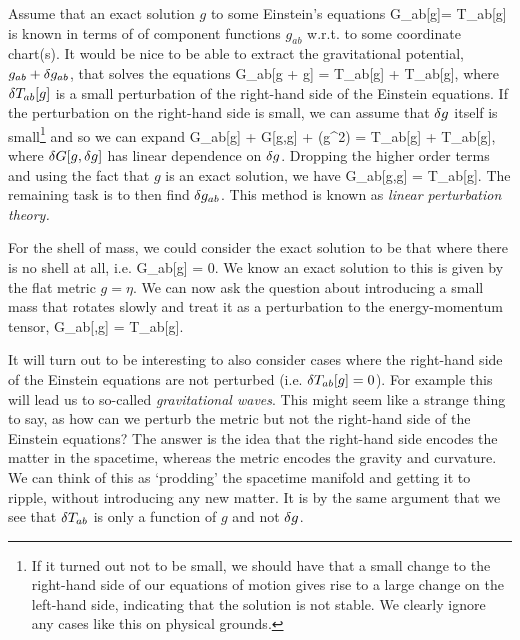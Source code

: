 Assume that an exact solution $g$ to some Einstein's equations
\bse 
    G_{ab}[g]= T_{ab}[g]
\ese 
is known in terms of of component functions $g_{ab}$ w.r.t. to some coordinate chart(s). It would be nice to be able to extract the gravitational potential, $g_{ab} + \delta g_{ab}$, that solves the equations
\bse 
    G_{ab}[g + \del g] = T_{ab}[g] + \del T_{ab}[g],  
\ese
where $\delta T_{ab}[g]$ is a small perturbation of the right-hand side of the Einstein equations. If the perturbation on the right-hand side is small, we can assume that $\delta g$ itself is small\footnote{If it turned out not to be small, we should have that a small change to the right-hand side of our equations of motion gives rise to a large change on the left-hand side, indicating that the solution is not stable. We clearly ignore any cases like this on physical grounds.} and so we can expand 
\bse 
    G_{ab}[g] + \del G[g,\del g] + \cO(\del g^2) = T_{ab}[g] + \del T_{ab}[g],
\ese 
where $\delta G[g,\delta g]$ has linear dependence on $\delta g$. Dropping the higher order terms and using the fact that $g$ is an exact solution, we have 
\bse 
    \del G_{ab}[g,\del g] = \del T_{ab}[g].
\ese
The remaining task is to then find $\delta g_{ab}$. This method is known as \textit{linear perturbation theory.}

\bex 
    For the shell of mass, we could consider the exact solution to be that where there is no shell at all, i.e. 
    \bse 
        G_{ab}[g] = 0.
    \ese
    We know an exact solution to this is given by the flat metric $g=\eta$. We can now ask the question about introducing a small mass that rotates slowly and treat it as a perturbation to the energy-momentum tensor,
    \bse 
        \del G_{ab}[\eta,\del g] = \del T_{ab}[g].
    \ese 
\eex 

\br 
    It will turn out to be interesting to also consider cases where the right-hand side of the Einstein equations are not perturbed (i.e. $\delta T_{ab}[g]=0$). For example this will lead us to so-called \textit{gravitational waves}. This might seem like a strange thing to say, as how can we perturb the metric but not the right-hand side of the Einstein equations? The answer is the idea that the right-hand side encodes the matter in the spacetime, whereas the metric encodes the gravity and curvature. We can think of this as `prodding' the spacetime manifold and getting it to ripple, without introducing any new matter. It is by the same argument that we see that $\delta T_{ab}$ is only a function of $g$ and not $\delta g$.
\er 

